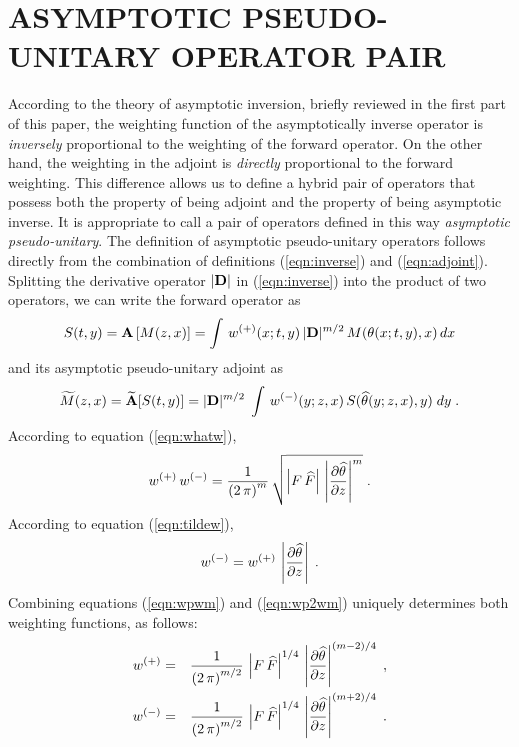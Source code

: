 
\section{ASYMPTOTIC PSEUDO-UNITARY OPERATOR PAIR}
According to the theory of asymptotic inversion, briefly reviewed in
the first part of this paper, the weighting function of the
asymptotically inverse operator is {\em inversely} proportional to the
weighting of the forward operator. On the other hand, the weighting in
the adjoint is {\em directly} proportional to the forward
weighting. This difference allows us to define a hybrid pair of
operators that possess both the property of being adjoint and the
property of being asymptotic inverse. It is appropriate to call a pair
of operators defined in this way {\em asymptotic pseudo-unitary}. The
definition of asymptotic pseudo-unitary operators follows directly
from the combination of definitions (\ref{eqn:inverse}) and
(\ref{eqn:adjoint}). Splitting the derivative operator $|{\bf D}|$ in
(\ref{eqn:inverse}) into the product of two operators, we can write the
forward operator as 
\begin{equation}
S(t,y)= {\bf A}\left[M(z,x)\right]= 
\int\,w^{(+)}(x;t,y)\,|{\bf D}|^{m/2}\,M(\theta(x;t,y),x)\,dx
\label{eqn:forward}
\end{equation}
and its asymptotic pseudo-unitary adjoint as
\begin{equation}
\widetilde{M}(z,x)={\bf \widetilde{A}}[S(t,y)]=
|{\bf D}|^{m/2}\;\int\,w^{(-)}(y;z,x)\,S(\widehat{\theta}(y;z,x),y)\;dy\;.
\label{eqn:backward}
\end{equation}
According to equation (\ref{eqn:whatw}),
\begin{equation}
w^{(+)}\,w^{(-)}={1\over{\left(2\,\pi\right)^m}} \, 
{\sqrt{\left|F\,\widehat{F}\right|\,
\left|\partial \widehat{\theta} \over \partial z\right|^m}}\;.
\label{eqn:wpwm}
\end{equation}
According to equation (\ref{eqn:tildew}),
\begin{equation}
w^{(-)}= w^{(+)}\, 
\left|\partial \widehat{\theta} \over \partial z\right|\;.
\label{eqn:wp2wm}
\end{equation}
Combining equations (\ref{eqn:wpwm}) and (\ref{eqn:wp2wm}) uniquely determines
both weighting functions, as follows:
\begin{eqnarray}
w^{(+)} & = & {1\over{\left(2\,\pi\right)^{m/2}}} \, 
\left|F\,\widehat{F}\right|^{1/4}\,
\left|\partial \widehat{\theta} \over \partial z\right|^{(m-2)/4}\;,
\label{eqn:wp} \\
w^{(-)} & = & {1\over{\left(2\,\pi\right)^{m/2}}} \, 
\left|F\,\widehat{F}\right|^{1/4}\,
\left|\partial \widehat{\theta} \over \partial z\right|^{(m+2)/4}\;.
\label{eqn:wm}
\end{eqnarray}
